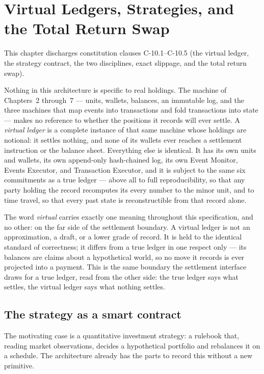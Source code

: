 \section{Virtual Ledgers, Strategies, and the Total Return Swap}
\label{ch:virtual}

This chapter discharges constitution clauses C-10.1--C-10.5 (the virtual ledger, the strategy contract, the two disciplines, exact slippage, and the total return swap).

Nothing in this architecture is specific to real holdings. The machine of
Chapters~2 through~7 --- units, wallets, balances, an immutable log, and the
three machines that map events into transactions and fold transactions into
state --- makes no reference to whether the positions it records will ever
settle. A \emph{virtual ledger} is a complete instance of that same machine
whose holdings are notional: it settles nothing, and none of its wallets ever
reaches a settlement instruction or the balance sheet. Everything else is
identical. It has its own units and wallets, its own append-only hash-chained
log, its own Event Monitor, Events Executor, and Transaction Executor, and it is
subject to the same six commitments as a true ledger --- above all to full
reproducibility, so that any party holding the record recomputes its every
number to the minor unit, and to time travel, so that every past state is
reconstructible from that record alone.

The word \emph{virtual} carries exactly one meaning throughout this
specification, and no other: on the far side of the settlement boundary. A
virtual ledger is not an approximation, a draft, or a lower grade of record. It
is held to the identical standard of correctness; it differs from a true ledger
in one respect only --- its balances are claims about a hypothetical world, so
no move it records is ever projected into a payment. This is the same boundary
the settlement interface draws for a true ledger, read from the other side: the
true ledger says what settles, the virtual ledger says what nothing settles.

\subsection{The strategy as a smart contract}

The motivating case is a quantitative investment strategy: a rulebook that,
reading market observations, decides a hypothetical portfolio and rebalances it
on a schedule. The architecture already has the parts to record this without a
new primitive.

